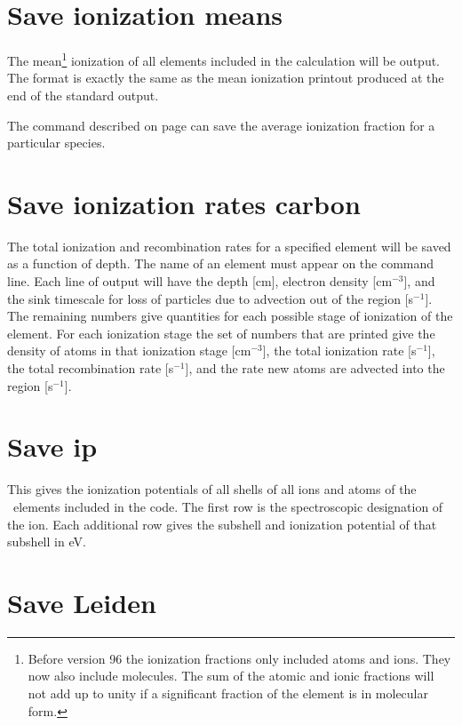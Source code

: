 \section{Save ionization means}
\label{sec:CommandSaveIonizationMeans} 

The mean\footnote{Before version 96 the ionization fractions only included atoms and
ions.  They now also include molecules.  The sum of the atomic and ionic
fractions will not add up to unity if a significant fraction of the element
is in molecular form.} ionization of all elements included in the calculation will
be output.  The format is exactly the same as the mean ionization printout
produced at the end of the standard output.

The  command described on
page \pageref{sec:CommandSaveAverage} can save
the average ionization fraction for a particular species.

\section{Save ionization rates carbon}

The total ionization and recombination rates for a specified element
will be saved as a function of depth.
The name of an element must appear
on the command line.
Each line of output will have the depth [cm], electron
density [cm$^{-3}$], and the sink timescale for loss of particles due to advection
out of the region [s$^{-1}$].
The remaining numbers give quantities for each
possible stage of ionization of the element.  For each ionization stage
the set of numbers that are printed give the density of atoms in that
ionization stage [cm$^{-3}$], the total ionization rate [s$^{-1}$],
the total recombination rate [s$^{-1}$], and the rate new atoms
are advected into the region [s$^{-1}$].

\section{Save ip}

This gives the ionization potentials of all shells of all ions and atoms
of the \LIMELM\ elements included in the code.  The first row is the spectroscopic
designation of the ion.  Each additional row gives the subshell and
ionization potential of that subshell in eV.

\section{Save Leiden}

